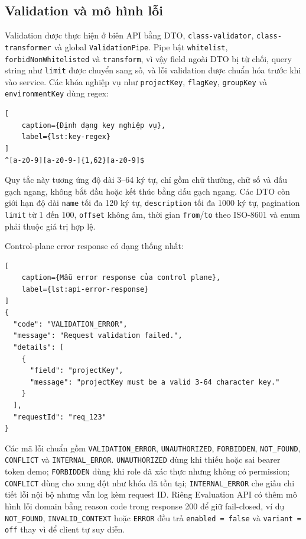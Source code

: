 \subsection{Validation và mô hình lỗi}

Validation được thực hiện ở biên API bằng DTO, \texttt{class-validator}, \texttt{class-transformer} và global \texttt{ValidationPipe}. Pipe bật \texttt{whitelist}, \texttt{forbidNonWhitelisted} và \texttt{transform}, vì vậy field ngoài DTO bị từ chối, query string như \texttt{limit} được chuyển sang số, và lỗi validation được chuẩn hóa trước khi vào service. Các khóa nghiệp vụ như \texttt{projectKey}, \texttt{flagKey}, \texttt{groupKey} và \texttt{environmentKey} dùng regex:

\begin{lstlisting}[
    caption={Định dạng key nghiệp vụ},
    label={lst:key-regex}
]
^[a-z0-9][a-z0-9-]{1,62}[a-z0-9]$
\end{lstlisting}

Quy tắc này tương ứng độ dài 3--64 ký tự, chỉ gồm chữ thường, chữ số và dấu gạch ngang, không bắt đầu hoặc kết thúc bằng dấu gạch ngang. Các DTO còn giới hạn độ dài \texttt{name} tối đa 120 ký tự, \texttt{description} tối đa 1000 ký tự, pagination \texttt{limit} từ 1 đến 100, \texttt{offset} không âm, thời gian \texttt{from}/\texttt{to} theo ISO-8601 và enum phải thuộc giá trị hợp lệ.

Control-plane error response có dạng thống nhất:

\begin{lstlisting}[
    caption={Mẫu error response của control plane},
    label={lst:api-error-response}
]
{
  "code": "VALIDATION_ERROR",
  "message": "Request validation failed.",
  "details": [
    {
      "field": "projectKey",
      "message": "projectKey must be a valid 3-64 character key."
    }
  ],
  "requestId": "req_123"
}
\end{lstlisting}

Các mã lỗi chuẩn gồm \texttt{VALIDATION\_ERROR}, \texttt{UNAUTHORIZED}, \texttt{FORBIDDEN}, \texttt{NOT\_FOUND}, \texttt{CONFLICT} và \texttt{INTERNAL\_ERROR}. \texttt{UNAUTHORIZED} dùng khi thiếu hoặc sai bearer token demo; \texttt{FORBIDDEN} dùng khi role đã xác thực nhưng không có permission; \texttt{CONFLICT} dùng cho xung đột như khóa đã tồn tại; \texttt{INTERNAL\_ERROR} che giấu chi tiết lỗi nội bộ nhưng vẫn log kèm request ID. Riêng Evaluation API có thêm mô hình lỗi domain bằng reason code trong response 200 để giữ fail-closed, ví dụ \texttt{NOT\_FOUND}, \texttt{INVALID\_CONTEXT} hoặc \texttt{ERROR} đều trả \texttt{enabled = false} và \texttt{variant = off} thay vì để client tự suy diễn.
